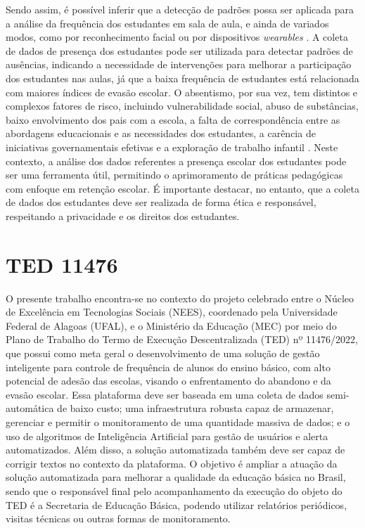 Sendo assim, é possível inferir que a detecção de padrões possa ser aplicada para a análise da frequência dos estudantes em sala de aula, e ainda de variados modos, como por reconhecimento facial \cite{BUDIMAN202331} ou por dispositivos \textit{wearables} \cite{ferreira:sbie}. A coleta de dados de presença dos estudantes pode ser utilizada para detectar padrões de ausências, indicando a necessidade de intervenções para melhorar a participação dos estudantes nas aulas, já que a baixa frequência de estudantes está relacionada com maiores índices de evasão escolar. O absentismo, por sua vez, tem distintos e complexos fatores de risco, incluindo vulnerabilidade social, abuso de substâncias, baixo envolvimento dos pais com a escola, a falta de correspondência entre as abordagens educacionais e as necessidades dos estudantes, a carência de iniciativas governamentais efetivas e a exploração de trabalho infantil \cite{nascimento:2020, gubbels:2019}. Neste contexto, a análise dos dados referentes a presença escolar dos estudantes pode ser uma ferramenta útil, permitindo o aprimoramento de práticas pedagógicas com enfoque em retenção escolar. É importante destacar, no entanto, que a coleta de dados dos estudantes deve ser realizada de forma ética e responsável, respeitando a privacidade e os direitos dos estudantes.

\section{TED 11476}

O presente trabalho encontra-se no contexto do projeto celebrado entre o Núcleo de Excelência em Tecnologias Sociais (NEES), coordenado pela Universidade Federal de Alagoas (UFAL), e o Ministério da Educação (MEC) por meio do Plano de Trabalho do Termo de Execução Descentralizada (TED) nº 11476/2022, que possui como meta geral o desenvolvimento de uma solução de gestão inteligente para controle de frequência de alunos do ensino básico, com alto potencial de adesão das escolas, visando o enfrentamento do abandono e da evasão escolar. Essa plataforma deve ser baseada em uma coleta de dados semi-automática de baixo custo; uma infraestrutura robusta capaz de armazenar, gerenciar e permitir o monitoramento de uma quantidade massiva de dados; e o uso de algoritmos de Inteligência Artificial para gestão de usuários e alerta automatizados. Além disso, a solução automatizada também deve ser capaz de corrigir textos no contexto da plataforma. O objetivo é ampliar a atuação da solução automatizada para melhorar a qualidade da educação básica no Brasil, sendo que o responsável final pelo acompanhamento da execução do objeto do TED é a Secretaria de Educação Básica, podendo utilizar relatórios periódicos, visitas técnicas ou outras formas de monitoramento.

